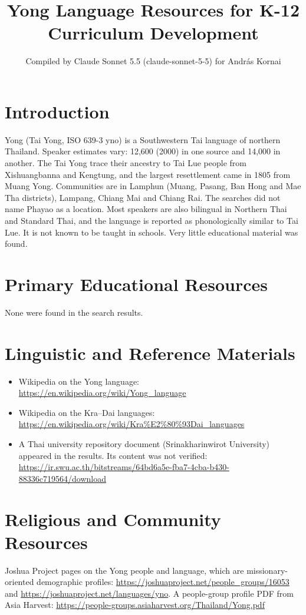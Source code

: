 \documentclass[12pt]{article}
\title{Yong Language Resources for K-12 Curriculum Development}
\author{Compiled by Claude Sonnet 5.5 (claude-sonnet-5-5) for Andr\'as Kornai}
\date{}
\begin{document}
\maketitle

\section{Introduction}
Yong (Tai Yong, ISO 639-3 yno) is a Southwestern Tai language of northern Thailand. Speaker estimates vary: 12,600 (2000) in one source and 14,000 in another. The Tai Yong trace their ancestry to Tai Lue people from Xishuangbanna and Kengtung, and the largest resettlement came in 1805 from Muang Yong. Communities are in Lamphun (Muang, Pasang, Ban Hong and Mae Tha districts), Lampang, Chiang Mai and Chiang Rai. The searches did not name Phayao as a location. Most speakers are also bilingual in Northern Thai and Standard Thai, and the language is reported as phonologically similar to Tai Lue. It is not known to be taught in schools. Very little educational material was found.

\section{Primary Educational Resources}
None were found in the search results.

\section{Linguistic and Reference Materials}
\begin{itemize}
\item Wikipedia on the Yong language: \url{https://en.wikipedia.org/wiki/Yong_language}
\item Wikipedia on the Kra--Dai languages: \url{https://en.wikipedia.org/wiki/Kra%E2%80%93Dai_languages}
\item A Thai university repository document (Srinakharinwirot University) appeared in the results. Its content was not verified: \url{https://ir.swu.ac.th/bitstreams/64bd6a5e-fba7-4cba-b430-88336c719564/download}
\end{itemize}

\section{Religious and Community Resources}
Joshua Project pages on the Yong people and language, which are missionary-oriented demographic profiles: \url{https://joshuaproject.net/people_groups/16053} and \url{https://joshuaproject.net/languages/yno}. A people-group profile PDF from Asia Harvest: \url{https://people-groups.asiaharvest.org/Thailand/Yong.pdf}
\end{document}
